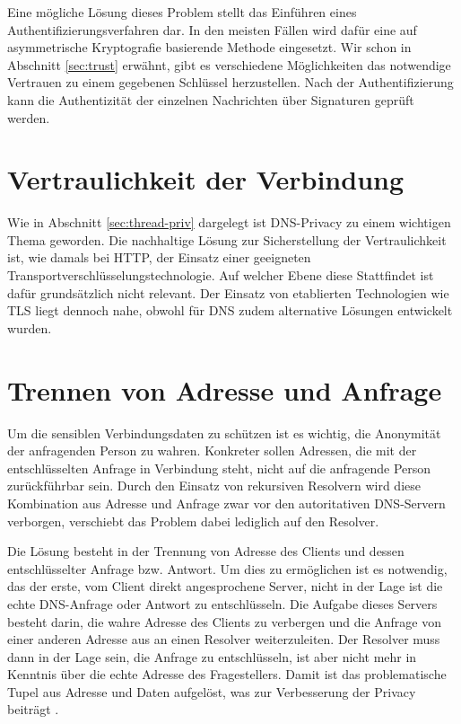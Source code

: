 Eine mögliche Lösung dieses Problem stellt das Einführen eines Authentifizierungsverfahren dar. In den meisten Fällen wird dafür eine auf asymmetrische Kryptografie basierende Methode eingesetzt. Wir schon in Abschnitt \ref{sec:trust} erwähnt, gibt es verschiedene Möglichkeiten das notwendige Vertrauen zu einem gegebenen Schlüssel herzustellen. Nach der Authentifizierung kann die Authentizität der einzelnen Nachrichten über Signaturen geprüft werden.

\section{Vertraulichkeit der Verbindung}
Wie in Abschnitt \ref{sec:thread-priv} dargelegt ist DNS-Privacy zu einem wichtigen Thema geworden. Die nachhaltige Lösung zur Sicherstellung der Vertraulichkeit ist, wie damals bei HTTP, der Einsatz einer geeigneten Transportverschlüsselungstechnologie. Auf welcher Ebene diese Stattfindet ist dafür grundsätzlich nicht relevant. Der Einsatz von etablierten Technologien wie TLS liegt dennoch nahe, obwohl für DNS zudem alternative Lösungen entwickelt wurden. 

\section{Trennen von Adresse und Anfrage}
\label{sec:goals-sourceanon}
Um die sensiblen Verbindungsdaten zu schützen ist es wichtig, die Anonymität der anfragenden Person zu wahren. Konkreter sollen Adressen, die mit der entschlüsselten Anfrage in Verbindung steht, nicht auf die anfragende Person zurückführbar sein. Durch den Einsatz von rekursiven Resolvern wird diese Kombination aus Adresse und Anfrage zwar vor den autoritativen DNS-Servern verborgen, verschiebt das Problem dabei lediglich auf den Resolver. 

Die Lösung besteht in der Trennung von Adresse des Clients und dessen entschlüsselter Anfrage bzw. Antwort. Um dies zu ermöglichen ist es notwendig, das der erste, vom Client direkt angesprochene Server, nicht in der Lage ist die echte DNS-Anfrage oder Antwort zu entschlüsseln. Die Aufgabe dieses Servers besteht darin, die wahre Adresse des Clients zu verbergen und die Anfrage von einer anderen Adresse aus an einen Resolver weiterzuleiten. Der Resolver muss dann in der Lage sein, die Anfrage zu entschlüsseln, ist aber nicht mehr in Kenntnis über die echte Adresse des Fragestellers. Damit ist das problematische Tupel aus Adresse und Daten aufgelöst, was zur Verbesserung der Privacy beiträgt \cite{Schmitt2018}.


